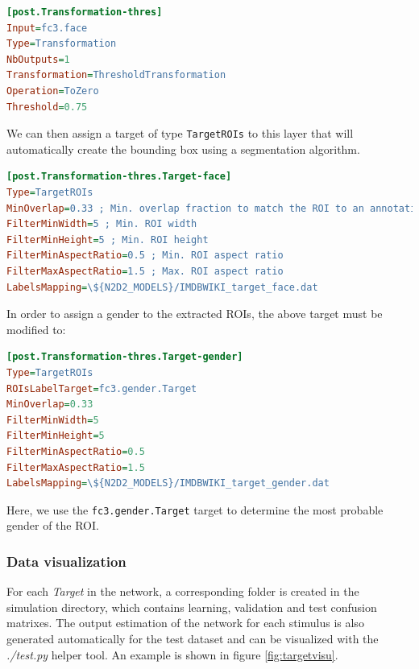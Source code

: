 \documentclass[a4paper,11pt,oneside]{article}
\begin{document}
\begin{lstlisting}[language=ini]
[post.Transformation-thres]
Input=fc3.face
Type=Transformation
NbOutputs=1
Transformation=ThresholdTransformation
Operation=ToZero
Threshold=0.75
\end{lstlisting}

We can then assign a target of type \lstinline!TargetROIs! to this layer that
will automatically create the bounding box using a segmentation algorithm.

\begin{lstlisting}[language=ini]
[post.Transformation-thres.Target-face]
Type=TargetROIs
MinOverlap=0.33 ; Min. overlap fraction to match the ROI to an annotation
FilterMinWidth=5 ; Min. ROI width
FilterMinHeight=5 ; Min. ROI height
FilterMinAspectRatio=0.5 ; Min. ROI aspect ratio
FilterMaxAspectRatio=1.5 ; Max. ROI aspect ratio
LabelsMapping=\${N2D2_MODELS}/IMDBWIKI_target_face.dat
\end{lstlisting}

In order to assign a gender to the extracted ROIs, the above target must be
modified to:

\begin{lstlisting}[language=ini]
[post.Transformation-thres.Target-gender]
Type=TargetROIs
ROIsLabelTarget=fc3.gender.Target
MinOverlap=0.33
FilterMinWidth=5
FilterMinHeight=5
FilterMinAspectRatio=0.5
FilterMaxAspectRatio=1.5
LabelsMapping=\${N2D2_MODELS}/IMDBWIKI_target_gender.dat
\end{lstlisting}

Here, we use the \lstinline!fc3.gender.Target! target to determine the most
probable gender of the ROI.

\subsubsection{Data visualization}

For each \emph{Target} in the network, a corresponding folder is created in the
simulation directory, which contains learning, validation and test confusion
matrixes. The output estimation of the network for each stimulus is also
generated automatically for the test dataset and can be visualized with the
\emph{./test.py} helper tool. An example is shown in figure
\ref{fig:targetvisu}.
\end{document}
